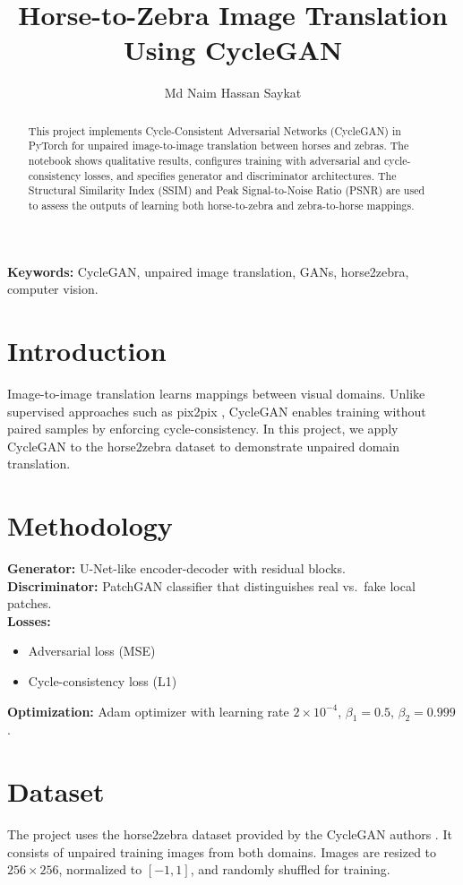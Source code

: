\documentclass[11pt,a4paper]{article}
\title{\textbf{Horse-to-Zebra Image Translation Using CycleGAN}}
\author{Md Naim Hassan Saykat}
\date{}
\begin{document}
\maketitle

\begin{abstract}
This project implements Cycle-Consistent Adversarial Networks (CycleGAN) in PyTorch for unpaired image-to-image translation between horses and zebras. The notebook shows qualitative results, configures training with adversarial and cycle-consistency losses, and specifies generator and discriminator architectures. The Structural Similarity Index (SSIM) and Peak Signal-to-Noise Ratio (PSNR) are used to assess the outputs of learning both horse-to-zebra and zebra-to-horse mappings.
\end{abstract}

\noindent \textbf{Keywords:} CycleGAN, unpaired image translation, GANs, horse2zebra, computer vision.

\section{Introduction}
Image-to-image translation learns mappings between visual domains. Unlike supervised approaches such as pix2pix \cite{Isola2017Pix2Pix}, CycleGAN \cite{Zhu2017CycleGAN} enables training without paired samples by enforcing cycle-consistency. In this project, we apply CycleGAN to the horse2zebra dataset to demonstrate unpaired domain translation.

\section{Methodology}
\textbf{Generator:} U-Net-like encoder-decoder with residual blocks. \\
\textbf{Discriminator:} PatchGAN classifier that distinguishes real vs.\ fake local patches. \\
\textbf{Losses:}
\begin{itemize}[leftmargin=1.25em]
    \item Adversarial loss (MSE)
    \item Cycle-consistency loss (L1)
\end{itemize}
\textbf{Optimization:} Adam optimizer with learning rate $2 \times 10^{-4}$, $\beta_1=0.5$, $\beta_2=0.999$.

\section{Dataset}
The project uses the horse2zebra dataset provided by the CycleGAN authors \cite{Zhu2017CycleGAN}. It consists of unpaired training images from both domains. Images are resized to $256 \times 256$, normalized to $[-1, 1]$, and randomly shuffled for training.
\end{document}
